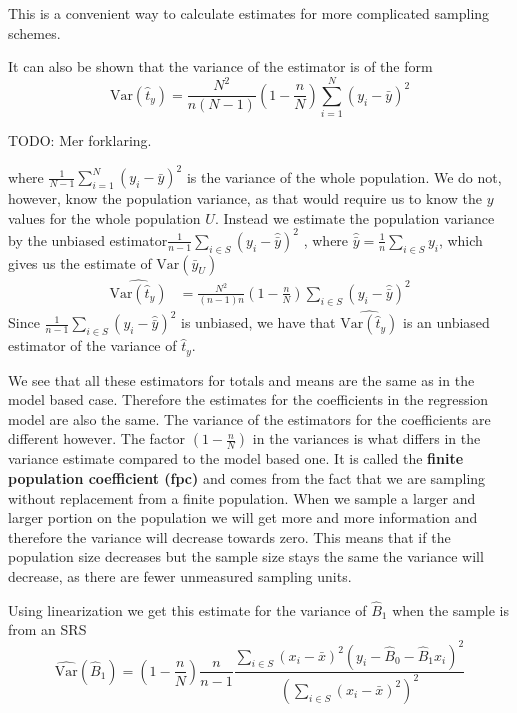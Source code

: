 \documentclass{article}
\begin{document}
This is a convenient way to calculate estimates for more complicated sampling
schemes.

It can also be shown that the variance of the estimator is of the form \begin{equation*}
\mathrm{Var} \left( \hat{t}_y \right) = \frac{N^2}{n \left( N - 1 \right)} \left( 1 - \frac{n}{N} \right) \sum_{i = 1}^N (y_i - \bar{y})^2 
\end{equation*}

TODO: Mer forklaring.

where
\(
\frac{1}{N - 1} \sum_{i = 1}^N (y_i - \bar{y})^2
\)
is the variance of the whole population.
We do not, however, know the population variance, as that would require us to know the \(y\) values
for the whole population \(U\). Instead we estimate the population variance by the unbiased estimator\(
 \frac{1}{n - 1} \sum_{i \in S} \left( y_i - \hat{\bar{y}} \right)^2
\)
, where \(\hat{\bar{y}} = \frac{1}{n} \sum_{i \in S} y_i \), which gives us the estimate of \(\mathrm{Var}(\bar{y}_U)\)\begin{align*}
 \widehat{\mathrm{Var}(\hat{t}_y)}
 &=\frac{N^2}{\left( n - 1 \right)n} \left( 1 - \frac{n}{N} \right) \sum_{i \in S} \left( y_i - \hat{\bar{y}} \right)^2
\end{align*}
Since \(\frac{1}{n - 1} \sum_{i \in S} \left( y_i - \hat{\bar{y}} \right)^2\) is unbiased, we have that \(\widehat{\mathrm{Var}(\hat{t}_y)}\) is an unbiased estimator of the variance of \(\hat{t}_y\).

We see that all these estimators for totals and means are the same as in the
model based case. Therefore the estimates for the coefficients in the regression
model are also the same. The variance of the estimators for the coefficients are
different however.
The factor \(\left( 1 - \frac{n}{N} \right)\) in the variances is what differs in
the variance estimate compared to the model based one. It is called the
\textbf{finite population coefficient (fpc)} and comes from the fact that we are
sampling without replacement from a finite population.
When we sample a larger and larger portion on the population we will get more
and more information and therefore the variance will decrease towards zero.
This means that if the population size decreases but the sample size stays the
same the variance will decrease, as there are fewer unmeasured sampling units.

Using linearization we get this estimate for the variance of \(\hat{B}_1\) when
the sample is from an SRS\begin{equation*}
\widehat{\mathrm{Var}}(\hat{B}_1) = \left( 1 - \frac{n}{N} \right) \frac{n}{n - 1} \frac{\sum_{i \in S} \left( x_i - \bar{x} \right)^2 \left( y_i - \hat{B}_0 - \hat{B}_1 x_i \right)^2}
{\left( \sum_{i \in S} \left( x_i - \bar{x} \right)^2 \right)^2}
\end{equation*}
\end{document}
